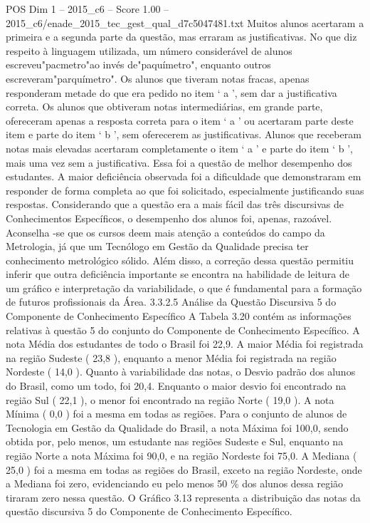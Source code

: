 \begin{textsample}{POS Dim 1 – 2015\_c6 – Score 1.00 – 2015\_c6/enade\_2015\_tec\_gest\_qual\_d7c5047481.txt}
Muitos alunos acertaram a primeira e a segunda parte da questão, mas erraram as justificativas.
No que diz respeito à linguagem utilizada, um número considerável de alunos escreveu"pacmetro"ao invés de"paquímetro", enquanto outros escreveram"parquímetro".
Os alunos que tiveram notas fracas, apenas responderam metade do que era pedido no item ‘ a ’, sem dar a justificativa correta.
Os alunos que obtiveram notas intermediárias, em grande parte, ofereceram apenas a resposta correta para o item ‘ a ’ ou acertaram parte deste item e parte do item ‘ b ’, sem oferecerem as justificativas.
Alunos que receberam notas mais elevadas acertaram completamente o item ‘ a ’ e parte do item ‘ b ’, mais uma vez sem a justificativa.
Essa foi a questão de melhor desempenho dos estudantes.
A maior deficiência observada foi a dificuldade que demonstraram em responder de forma completa ao que foi solicitado, especialmente justificando suas respostas.
Considerando que a questão era a mais fácil das três discursivas de Conhecimentos Específicos, o desempenho dos alunos foi, apenas, razoável.
Aconselha -se que os cursos deem mais atenção a conteúdos do campo da Metrologia, já que um Tecnólogo em Gestão da Qualidade precisa ter conhecimento metrológico sólido.
Além disso, a correção dessa questão permitiu inferir que outra deficiência importante se encontra na habilidade de leitura de um gráfico e interpretação da variabilidade, o que é fundamental para a formação de futuros profissionais da Área. 3.3.2.5 Análise da Questão Discursiva 5 do Componente de Conhecimento Específico A Tabela 3.20 contém as informações relativas à questão 5 do conjunto do Componente de Conhecimento Específico.
A nota Média dos estudantes de todo o Brasil foi 22,9.
A maior Média foi registrada na região Sudeste ( 23,8 ), enquanto a menor Média foi registrada na região Nordeste ( 14,0 ).
Quanto à variabilidade das notas, o Desvio padrão dos alunos do Brasil, como um todo, foi 20,4.
Enquanto o maior desvio foi encontrado na região Sul ( 22,1 ), o menor foi encontrado na região Norte ( 19,0 ).
A nota Mínima ( 0,0 ) foi a mesma em todas as regiões.
Para o conjunto de alunos de Tecnologia em Gestão da Qualidade do Brasil, a nota Máxima foi 100,0, sendo obtida por, pelo menos, um estudante nas regiões Sudeste e Sul, enquanto na região Norte a nota Máxima foi 90,0, e na região Nordeste foi 75,0.
A Mediana ( 25,0 ) foi a mesma em todas as regiões do Brasil, exceto na região Nordeste, onde a Mediana foi zero, evidenciando eu pelo menos 50 \% dos alunos dessa região tiraram zero nessa questão.
O Gráfico 3.13 representa a distribuição das notas da questão discursiva 5 do Componente de Conhecimento Específico.

\end{textsample}
